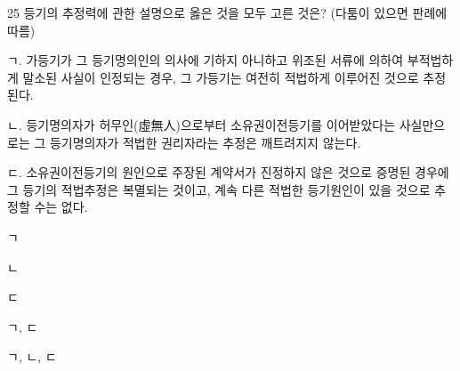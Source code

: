 \begin{question}{25}
등기의 추정력에 관한 설명으로 옳은 것을 모두 고른 것은? (다툼이 있으면 판례에 따름)
\begin{framedtext}
ㄱ. 가등기가 그 등기명의인의 의사에 기하지 아니하고 위조된 서류에 의하여 부적법하게 말소된 사실이 인정되는 경우, 그 가등기는 여전히 적법하게 이루어진 것으로 추정된다. \par
ㄴ. 등기명의자가 허무인(虛無人)으로부터 소유권이전등기를 이어받았다는 사실만으로는 그 등기명의자가 적법한 권리자라는 추정은 깨트려지지 않는다. \par
ㄷ. 소유권이전등기의 원인으로 주장된 계약서가 진정하지 않은 것으로 증명된 경우에 그 등기의 적법추정은 복멸되는 것이고, 계속 다른 적법한 등기원인이 있을 것으로 추정할 수는 없다.
\end{framedtext}
\begin{choices}
  \item ㄱ
  \item ㄴ
  \item ㄷ
  \item ㄱ, ㄷ
  \item ㄱ, ㄴ, ㄷ
\end{choices}
\end{question}
